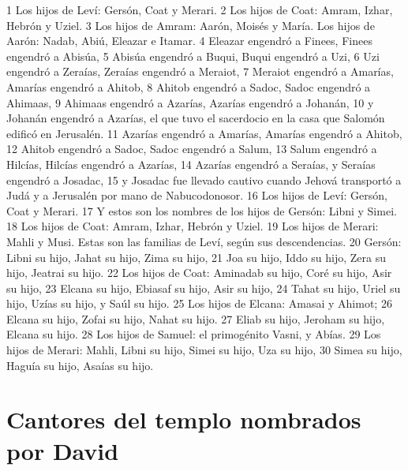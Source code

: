 1 Los hijos de Leví: Gersón, Coat y Merari.
2 Los hijos de Coat: Amram, Izhar, Hebrón y Uziel.
3 Los hijos de Amram: Aarón, Moisés y María. Los hijos de Aarón: Nadab, Abiú, Eleazar e Itamar.
4 Eleazar engendró a Finees, Finees engendró a Abisúa,
5 Abisúa engendró a Buqui, Buqui engendró a Uzi,
6 Uzi engendró a Zeraías, Zeraías engendró a Meraiot,
7 Meraiot engendró a Amarías, Amarías engendró a Ahitob,
8 Ahitob engendró a Sadoc, Sadoc engendró a Ahimaas,
9 Ahimaas engendró a Azarías, Azarías engendró a Johanán,
10 y Johanán engendró a Azarías, el que tuvo el sacerdocio en la casa que Salomón edificó en Jerusalén.
11 Azarías engendró a Amarías, Amarías engendró a Ahitob,
12 Ahitob engendró a Sadoc, Sadoc engendró a Salum,
13 Salum engendró a Hilcías, Hilcías engendró a Azarías,
14 Azarías engendró a Seraías, y Seraías engendró a Josadac,
15 y Josadac fue llevado cautivo cuando Jehová transportó a Judá y a Jerusalén por mano de Nabucodonosor.
16 Los hijos de Leví: Gersón, Coat y Merari.
17 Y estos son los nombres de los hijos de Gersón: Libni y Simei.
18 Los hijos de Coat: Amram, Izhar, Hebrón y Uziel.
19 Los hijos de Merari: Mahli y Musi. Estas son las familias de Leví, según sus descendencias. 
20 Gersón: Libni su hijo, Jahat su hijo, Zima su hijo,
21 Joa su hijo, Iddo su hijo, Zera su hijo, Jeatrai su hijo.
22 Los hijos de Coat: Aminadab su hijo, Coré su hijo, Asir su hijo,
23 Elcana su hijo, Ebiasaf su hijo, Asir su hijo,
24 Tahat su hijo, Uriel su hijo, Uzías su hijo, y Saúl su hijo.
25 Los hijos de Elcana: Amasai y Ahimot;
26 Elcana su hijo, Zofai su hijo, Nahat su hijo.
27 Eliab su hijo, Jeroham su hijo, Elcana su hijo.
28 Los hijos de Samuel: el primogénito Vasni, y Abías.
29 Los hijos de Merari: Mahli, Libni su hijo, Simei su hijo, Uza su hijo,
30 Simea su hijo, Haguía su hijo, Asaías su hijo.

\section*{Cantores del templo nombrados por David}

